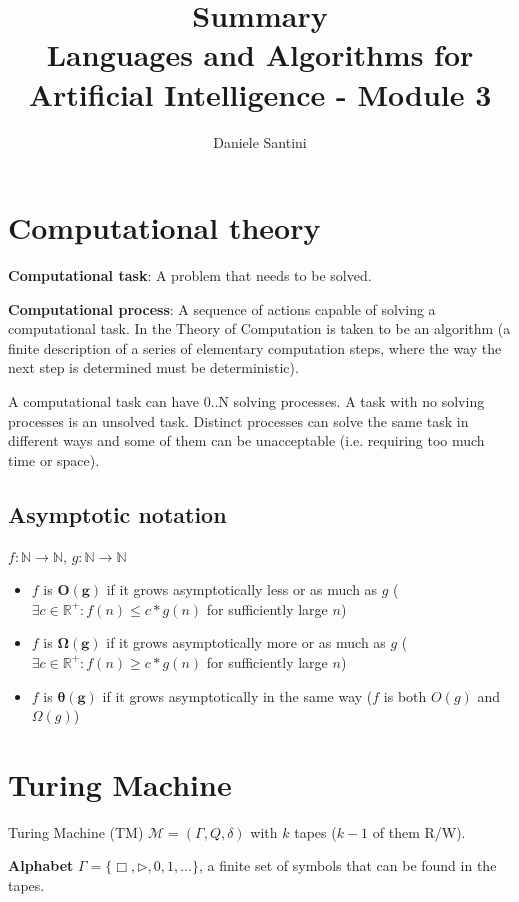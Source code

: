 \documentclass[]{article}
\title{Summary \\ \large Languages and Algorithms for Artificial Intelligence - Module 3}
\author{Daniele Santini}
\begin{document}

\section{Computational theory}

\textbf{Computational task}: A problem that needs to be solved.

\textbf{Computational process}: A sequence of actions capable of solving a computational task. In the Theory of Computation is taken to be an algorithm (a finite description of a series of elementary computation steps, where the way the next step is determined must be deterministic).

A computational task can have 0..N solving processes. A task with no solving processes is an unsolved task. Distinct processes can solve the same task in different ways and some of them can be unacceptable (i.e. requiring too much time or space).

\subsection{Asymptotic notation}

$f:\mathbb{N}\to\mathbb{N}$, $g:\mathbb{N}\to\mathbb{N}$
\begin{itemize}
	\item $f$ is $\mathbf{O(g)}$ if it grows asymptotically less or as  much as $g$ ($\exists c \in \mathbb{R}^+ : f(n) \le c * g(n)$ for sufficiently large $n$)
	\item $f$ is $\mathbf{\Omega(g)}$ if it grows asymptotically more or as much as $g$ ($\exists c \in \mathbb{R}^+ : f(n) \ge c * g(n)$ for sufficiently large $n$)
	\item $f$ is $\mathbf{\theta(g)}$ if it grows asymptotically in the same way ($f$ is both $O(g)$ and $\Omega(g)$)
\end{itemize}

\section{Turing Machine}

Turing Machine (TM) $\mathcal{M} = (\Gamma,Q,\delta)$ with $k$ tapes ($k-1$ of them R/W).

\textbf{Alphabet} $\Gamma = \{\Box, \rhd, 0, 1, \dots\}$, a finite set of symbols that can be found in the tapes.
\end{document}
